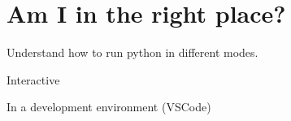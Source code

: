 \section{Am I in the right place?} \label{sec:KnowYourPlace}

Understand how to run python in different modes.

Interactive

In a development environment (VSCode)